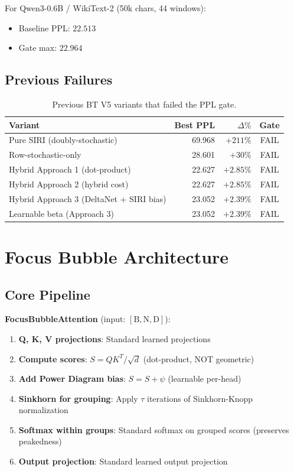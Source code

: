 \documentclass[11pt]{article}
\begin{document}
For Qwen3-0.6B / WikiText-2 (50k chars, 44 windows):
\begin{itemize}
  \item Baseline PPL: $22.513$
  \item Gate max: $22.964$
\end{itemize}

\subsection{Previous Failures}

\begin{table}[h]
\centering
\caption{Previous BT V5 variants that failed the PPL gate.}
\label{tab:failures}
\begin{tabular}{lrrc}
\toprule
Variant & Best PPL & $\Delta\%$ & Gate \\
\midrule
Pure SIRI (doubly-stochastic) & 69.968 & $+211\%$ & FAIL \\
Row-stochastic-only & 28.601 & $+30\%$ & FAIL \\
Hybrid Approach 1 (dot-product) & 22.627 & $+2.85\%$ & FAIL \\
Hybrid Approach 2 (hybrid cost) & 22.627 & $+2.85\%$ & FAIL \\
Hybrid Approach 3 (DeltaNet + SIRI bias) & 23.052 & $+2.39\%$ & FAIL \\
Learnable beta (Approach 3) & 23.052 & $+2.39\%$ & FAIL \\
\bottomrule
\end{tabular}
\end{table}

\section{Focus Bubble Architecture}

\subsection{Core Pipeline}

\textbf{FocusBubbleAttention} (input: $[\text{B}, \text{N}, \text{D}]$):

\begin{enumerate}
  \item \textbf{Q, K, V projections}: Standard learned projections
  \item \textbf{Compute scores}: $S = QK^T / \sqrt{d}$ (dot-product, NOT geometric)
  \item \textbf{Add Power Diagram bias}: $S = S + \psi$ (learnable per-head)
  \item \textbf{Sinkhorn for grouping}: Apply $\tau$ iterations of Sinkhorn-Knopp normalization
  \item \textbf{Softmax within groups}: Standard softmax on grouped scores (preserves peakedness)
  \item \textbf{Output projection}: Standard learned output projection
\end{enumerate}
\end{document}
